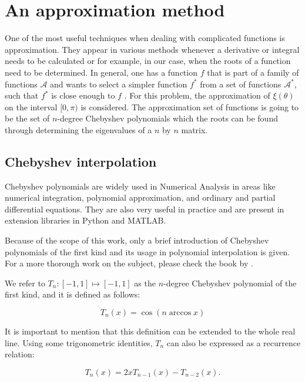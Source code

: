 \section{An approximation method}

One of the most useful techniques when dealing with complicated functions is approximation. They appear in various methods whenever a derivative or integral needs to be calculated or for example, in our case, when the roots of a function need to be determined. In general, one has a function $f$ that is part of a family of functions $\mathcal{A}$ and wants to select a simpler function $f^*$ from a set of functions $\mathcal{A^*}$, such that $f^*$ is close enough to $f$ \cite[p.~3]{powell}. For this problem, the approximation of $\xi(\theta)$ on the interval $[0, \pi)$ is considered. The approximation set of functions is going to be the set of $n$-degree Chebyshev polynomials which the roots can be found through determining the eigenvalues of a $n$ by $n$ matrix.


\subsection{Chebyshev interpolation}

Chebyshev polynomials are widely used in Numerical Analysis in areas like numerical integration, polynomial approximation, and ordinary and partial differential equations.
They are also very useful in practice and are present in extension libraries in Python and MATLAB.

Because of the scope of this work, only a brief introduction of Chebyshev polynomials of the first kind and its usage in polynomial interpolation is given. For a more thorough work on the subject, please check the book by .

We refer to $T_n : [-1, 1] \mapsto [-1, 1]$ as the $n$-degree Chebyshev polynomial of the first kind, and it is defined as follows:

\begin{equation}
T_n(x) = \cos({n\arccos x})
\end{equation}

It is important to mention that this definition can be extended to the whole real line. Using some trigonometric identities, $T_n$ can also be expressed as a recurrence relation:

\begin{equation}
T_n(x) = 2xT_{n-1}(x) - T_{n-2}(x).
\end{equation}

